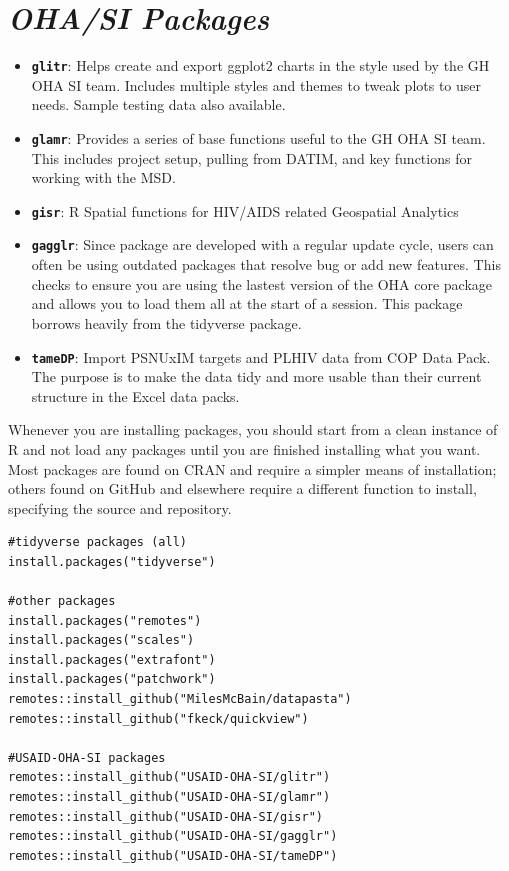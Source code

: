 \documentclass[
  letterpaper,
  DIV=11,
  numbers=noendperiod]{scrreprt}
\providecommand{\tightlist}{%
  \setlength{\itemsep}{0pt}\setlength{\parskip}{0pt}}\usepackage{longtable,booktabs,array}
\begin{document}
\hypertarget{ohasi-packages}{%
\section{\texorpdfstring{\emph{OHA/SI
Packages}}{OHA/SI Packages}}\label{ohasi-packages}}

\begin{itemize}
\tightlist
\item
  \textbf{\texttt{glitr}}: Helps create and export ggplot2 charts in the
  style used by the GH OHA SI team. Includes multiple styles and themes
  to tweak plots to user needs. Sample testing data also available.
\item
  \textbf{\texttt{glamr}}: Provides a series of base functions useful to
  the GH OHA SI team. This includes project setup, pulling from DATIM,
  and key functions for working with the MSD.
\item
  \textbf{\texttt{gisr}}: R Spatial functions for HIV/AIDS related
  Geospatial Analytics
\item
  \textbf{\texttt{gagglr}}: Since package are developed with a regular
  update cycle, users can often be using outdated packages that resolve
  bug or add new features. This checks to ensure you are using the
  lastest version of the OHA core package and allows you to load them
  all at the start of a session. This package borrows heavily from the
  tidyverse package.
\item
  \textbf{\texttt{tameDP}}: Import PSNUxIM targets and PLHIV data from
  COP Data Pack. The purpose is to make the data tidy and more usable
  than their current structure in the Excel data packs.
\end{itemize}

Whenever you are installing packages, you should start from a clean
instance of R and not load any packages until you are finished
installing what you want. Most packages are found on CRAN and require a
simpler means of installation; others found on GitHub and elsewhere
require a different function to install, specifying the source and
repository.

\begin{verbatim}
#tidyverse packages (all)
install.packages("tidyverse")

#other packages
install.packages("remotes")
install.packages("scales")
install.packages("extrafont")
install.packages("patchwork")
remotes::install_github("MilesMcBain/datapasta")
remotes::install_github("fkeck/quickview")

#USAID-OHA-SI packages
remotes::install_github("USAID-OHA-SI/glitr")
remotes::install_github("USAID-OHA-SI/glamr")
remotes::install_github("USAID-OHA-SI/gisr")
remotes::install_github("USAID-OHA-SI/gagglr")
remotes::install_github("USAID-OHA-SI/tameDP")
\end{verbatim}
\end{document}

